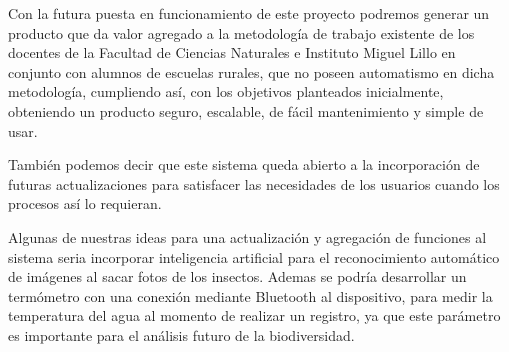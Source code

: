 



Con la futura puesta en funcionamiento de este proyecto podremos generar un producto que da valor agregado a la metodología de trabajo existente de los docentes de la Facultad de Ciencias Naturales e Instituto Miguel Lillo en conjunto con alumnos de escuelas rurales, que no poseen automatismo en dicha metodología, cumpliendo así, con los objetivos planteados inicialmente, obteniendo un producto seguro, escalable, de fácil mantenimiento y simple de usar.

También podemos decir que este sistema queda abierto a la incorporación de futuras actualizaciones para satisfacer las necesidades de los usuarios cuando los procesos así lo requieran.

Algunas de nuestras ideas para una actualización y agregación de funciones al sistema seria incorporar inteligencia artificial para el reconocimiento automático de imágenes al sacar fotos de los insectos. Ademas se podría desarrollar un termómetro con una conexión mediante Bluetooth al dispositivo, para medir la temperatura del agua al momento de realizar un registro, ya que este parámetro es importante para el análisis futuro de la biodiversidad.

\label{chap:conclusiones}
